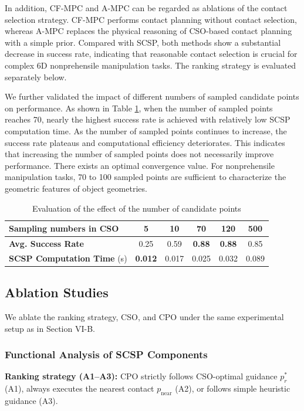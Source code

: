 In addition, CF-MPC and A-MPC can be regarded as ablations of the contact selection strategy. CF-MPC performs contact planning without contact selection, whereas A-MPC replaces the physical reasoning of CSO-based contact planning with a simple prior. Compared with SCSP, both methods show a substantial decrease in success rate, indicating that reasonable contact selection is crucial for complex 6D nonprehensile manipulation tasks. The ranking strategy is evaluated separately below.

We further validated the impact of different numbers of sampled candidate points on performance. As shown in Table \ref{tab:cso_sampling}, when the number of sampled points reaches 70, nearly the highest success rate is achieved with relatively low SCSP computation time. As the number of sampled points continues to increase, the success rate plateaus and computational efficiency deteriorates. This indicates that increasing the number of sampled points does not necessarily improve performance. There exists an optimal convergence value. For nonprehensile manipulation tasks, 70 to 100 sampled points are sufficient to characterize the geometric features of object geometries.


\begin{table}[t]
\centering
\caption{Evaluation of the effect of the number of candidate points}
\label{tab:cso_sampling}
\begin{tabular}{lccccc}
\toprule
\textbf{Sampling numbers in CSO} & \textbf{5} & \textbf{10} & \textbf{70} & \textbf{120} & \textbf{500} \\
\midrule
\textbf{Avg. Success Rate}      & 0.25  & 0.59 & \textbf{0.88} & \textbf{0.88} & 0.85 \\
\textbf{SCSP Computation Time} (s)  & \textbf{0.012} & 0.017 & 0.025 & 0.032 & 0.089 \\
\bottomrule
\end{tabular}
\end{table}


\subsection{Ablation Studies}


We ablate the ranking strategy, CSO, and CPO under the same experimental setup as in Section VI-B.

\subsubsection{Functional Analysis of SCSP Components}
\label{sec:component_ablation}
\textbf{Ranking strategy (A1--A3):} CPO strictly follows CSO-optimal guidance $p_r^*$ (A1), always executes the nearest contact $p_{\text{near}}$ (A2), or follows simple heuristic guidance (A3).

